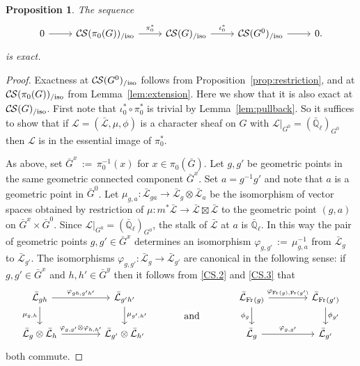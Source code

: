 \documentclass[10pt]{amsart}
\theoremstyle{plain}
\newtheorem{proposition}[theorem]{Proposition}
\theoremstyle{definition}
\newcommand{\EE}{\mathbb{\bar Q}_\ell}
\newcommand{\Frob}[1]{\operatorname{Fr}_{#1}}
\newcommand{\ceq}{{\, :=\, }}
\newcommand{\cs}[1]{{\mathcal{#1}}}
\newcommand{\gcs}[1]{{\mathcal{\bar #1}}}
\newcommand{\CS}{{\mathcal{C\hskip-0.8pt S}}}
\newcommand{\CSiso}[1]{\CS(#1)_{/\text{iso}}}
\newcommand{\bG}{\bar{G}}
\begin{document}
\begin{proposition}\label{prop:middleexact}
 The sequence
 \[
  \begin{tikzcd}
  0 \rar & \CSiso{\pi_0(G)} \arrow{r}{\pi_0^*} & \CSiso{G} \arrow{r}{\iota_0^*} & \CSiso{G^0} \rar & 0.
  \end{tikzcd}
 \]
 is exact.
\end{proposition}

\begin{proof}
Exactness at $\CSiso{G^0}$ follows from Proposition~\ref{prop:restriction},
and at $\CSiso{\pi_0(G)}$ from Lemma~\ref{lem:extension}.
Here we show that it is also exact at $\CSiso{G}$.
First note that $\iota_0^* \circ \pi_0^*$ is trivial by Lemma~\ref{lem:pullback}.
So it suffices to show that if $\cs{L} = (\gcs{L},\mu,\phi)$ is a character sheaf on $G$
with $\cs{L}\vert_{G^0} = (\EE)_{G^0}$ then $\cs{L}$ is in the essential image of $\pi_0^*$.

As above, set $\bG^x \ceq \pi_0^{-1}(x)$ for $x\in \pi_0(\bG)$.
Let $g, g'$ be geometric points in the same
geometric connected component $\bG^x$.
Set $a = g^{-1}g'$ and note that $a$ is a geometric point in $\bG^0$.
Let $\mu_{g,a} : \gcs{L}_{ga} \to \gcs{L}_g \otimes \gcs{L}_a$
be the isomorphism of vector spaces obtained by restriction of
$\mu : m^*\gcs{L} \to \gcs{L} \boxtimes \gcs{L}$ to the
geometric point $(g,a)$ on $\bG^x \times \bG^0$.
Since $\cs{L}\vert_{G^0} = (\EE)_{G^0}$,
the stalk of $\gcs{L}$ at $a$ is $\EE$.
In this way the pair of geometric points $g, g' \in \bG^x$
determines an isomorphism $\varphi_{g,g'} \ceq \mu_{g,a}^{-1}$
from $\gcs{L}_{g}$ to $\gcs{L}_{g'}$.
%
The isomorphisms $\varphi_{g,g'}: \gcs{L}_{g} \to \gcs{L}_{g'}$ are canonical
in the following sense: if $g,g'\in \bG^x$ and $h,h'\in \bG^y$
then it follows from \ref{CS.2} and \ref{CS.3}
that
 \begin{equation}\label{eq:CS}
  \begin{tikzcd}[column sep=40]
   \gcs{L}_{gh} \arrow{r}{\varphi_{gh,g'h'}} \arrow[swap]{d}{\mu_{g,h}}
  & \gcs{L}_{g'h'} \arrow{d}{\mu_{g',h'}}
  &\arrow[draw=none]{d}[pos=.4,description]{\text{\normalsize{and}}}
  &  \gcs{L}_{\Frob{}(g)} \arrow{r}{\varphi_{\Frob{}(g),\Frob{}(g')}} \arrow[swap]{d}{\phi_{g}} & \gcs{L}_{\Frob{}(g')} \arrow{d}{\phi_{g'}} \\
  \gcs{L}_{g} \otimes \gcs{L}_{h} \arrow{r}{\varphi_{g,g'}\otimes \varphi_{h,h'}}
  & \gcs{L}_{g'} \otimes \gcs{L}_{h'}
  & {}
  & \gcs{L}_{g} \arrow{r}{\varphi_{g,g'}} & \gcs{L}_{g'}
  \end{tikzcd}
 \end{equation}
both commute.


\end{proof}
\end{document}
